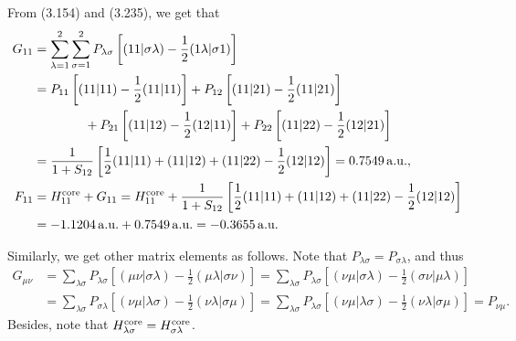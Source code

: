 \documentclass[a4paper]{book}
\newcounter{solution}[chapter]
\newcommand{\core}{{\rm core}}
\newcommand{\au}{{\rm a.u.}}
\begin{document}
	\begin{solution}
	
	From (3.154) and (3.235), we get that
	\begin{align*}
		G_{11} &= \sum_{ \lambda=1 }^2 \sum_{ \sigma=1 }^2 P_{ \lambda \sigma } \left[ ( 11 | \sigma \lambda ) - \frac{1}{2} ( 1 \lambda | \sigma 1 ) \right] \\
		&= P_{11} \left[ ( 11 | 11 ) - \frac{1}{2} ( 11 | 11 ) \right] + P_{12} \left[ ( 11 | 21 ) - \frac{1}{2} ( 11 | 21 ) \right] \\
		&\hspace{4em} + P_{21} \left[ ( 11 | 12 ) - \frac{1}{2} ( 12 | 11 ) \right] + P_{22} \left[ ( 11 | 22 ) - \frac{1}{2} ( 12 | 21 ) \right] \\
		&= \frac{1}{ 1 + S_{12} } \left[ \frac{1}{2} ( 11 | 11 ) + ( 11 | 12 ) + ( 11 | 22 ) - \frac{1}{2} ( 12 | 12 ) \right] = 0.7549 \, \au , \\
		F_{11} &= H^\core_{11} + G_{11} = H^\core_{11} + \frac{1}{ 1 + S_{12} } \left[ \frac{1}{2} ( 11 | 11 ) + ( 11 | 12 ) + ( 11 | 22 ) - \frac{1}{2} ( 12 | 12 ) \right] \\
		&= -1.1204 \, \au + 0.7549 \, \au = -0.3655 \, \au
	\end{align*}
	
	Similarly, we get other matrix elements as follows. Note that $P_{\lambda\sigma} = P_{\sigma\lambda}$, and thus
	\begin{align*}
		G_{\mu\nu} &= \sum_{\lambda \sigma} P_{\lambda \sigma} \left[ ( \mu \nu | \sigma \lambda ) - \frac{1}{2} ( \mu \lambda | \sigma \nu ) \right] = \sum_{\lambda \sigma} P_{\lambda \sigma} \left[ ( \nu \mu | \sigma \lambda ) - \frac{1}{2} ( \sigma \nu | \mu \lambda ) \right] \\
		&= \sum_{\lambda \sigma} P_{\sigma \lambda} \left[ ( \nu  \mu | \lambda \sigma ) - \frac{1}{2} ( \nu \lambda | \sigma \mu ) \right] = \sum_{\lambda \sigma} P_{\lambda \sigma} \left[ ( \nu  \mu | \lambda \sigma ) - \frac{1}{2} ( \nu \lambda | \sigma \mu ) \right] = P_{\nu \mu}.
	\end{align*}
	Besides, note that $H^\core_{\lambda\sigma} = H^\core_{\sigma\lambda}$.
	
	\begin{itemize}
	

\end{itemize}
\end{solution}
\end{document}
